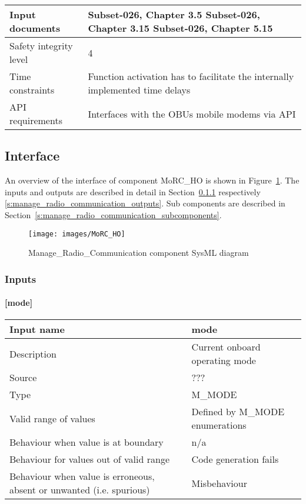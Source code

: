 \begin{longtable}{p{}p{}}
\\
\midrule
Input documents	& 
Subset-026, Chapter 3.5 \newline
Subset-026, Chapter 3.15 \newline
Subset-026, Chapter 5.15 \\
\midrule
Safety integrity level	& 4 \\
\midrule
Time constraints		& Function activation has to facilitate the internally implemented time delays  \\
\midrule
API requirements 		& Interfaces with the OBUs mobile modems via API\\
\bottomrule
\end{longtable}


\subsection{Interface}

An overview of the interface of component MoRC\_HO is shown in Figure~\ref{f:manage_radio_communication_interface}. The inputs and outputs are described in detail in Section~\ref{s:manage_radio_communication_inputs} respectively \ref{s:manage_radio_communication_outputs}. Sub components are described in Section~\ref{s:manage_radio_communication_subcomponents}.

\begin{figure}
\center
\texttt{[image: images/MoRC\_HO]}
\caption{Manage\_Radio\_Communication component SysML diagram}\label{f:manage_radio_communication_interface}
\end{figure}

\subsubsection{Inputs}\label{s:manage_radio_communication_inputs}

\paragraph{[mode]}

\begin{longtable}{p{}p{}}
\toprule
Input name				& mode \\
\midrule
Description				& Current onboard operating mode \\
\midrule
Source					& ??? \\ 
\midrule
Type					& M\_MODE \\
\midrule
Valid range of values	& Defined by M\_MODE enumerations \\
\midrule
Behaviour when value is at boundary	& n/a \\
\midrule
Behaviour for values out of valid range	& Code generation fails \\
\midrule
Behaviour when value is erroneous, absent or unwanted (i.e. spurious) & Misbehaviour \\
\bottomrule
\end{longtable}



